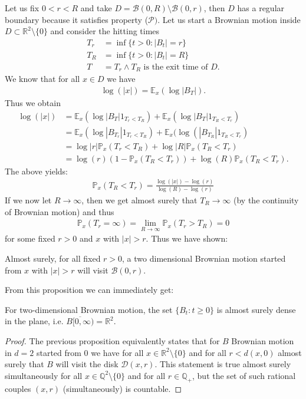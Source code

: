 \documentclass[../mainfile.tex]{subfiles}
\begin{document}
\begin{exmp} Let us fix $0<r<R$ and take $D= \mathcal{B}(0,R) \setminus \mathcal{B}(0,r)$, then $D$ has a regular boundary because it satisfies property ($\mathcal{P})$. Let us start a Brownian motion inside $D \subset \mathbb{R}^2 \setminus \{0\}$ and consider the hitting times
\begin{align*}
T_r&= \inf \{ t>0 : |B_t| =r \} \\
T_R& = \inf \{ t >0 : |B_t|=R\} \\
T&= T_r \wedge T_R \text{ is the exit time of }D. 
\end{align*}
We know that for all $x \in D$ we have 
\begin{align*}
\log(|x|)= \mathbb{E}_x( \log |B_T|).
\end{align*}
Thus we obtain 
\begin{align*}
\log(|x|) &= \mathbb{E}_x( \log |B_T| 1_{T_r < T_R}) + \mathbb{E}_x( \log |B_T| 1_{T_R < T_r})  \\
&= \mathbb{E}_x( \log|B_{T_r}| 1_{T_r < T_R}) + \mathbb{E}_x( \log( |B_{T_R}| 1_{T_R < T_r}) \\
&= \log|r| \mathbb{P}_x( T_r < T_R) + \log|R| \mathbb{P}_x(T_R < T_r)  \\
& = \log(r) (1- \mathbb{P}_x(T_R < T_r)) + \log(R) \mathbb{P}_x ( T_R < T_r).
\end{align*}
The above yields:
\begin{align*}
\mathbb{P}_x( T_R < T_r) = \frac{\log(|x|)- \log(r)}{\log(R)- \log(r)} \tag{*}
\end{align*}
If we now let $R \to \infty$, then we get almost surely that $T_R \to \infty$ (by the continuity of Brownian motion) and thus 
\begin{align*}
\mathbb{P}_x(T_r = \infty) = \lim_{R \to \infty} \mathbb{P}_x( T_r > T_R)=0
\end{align*}
for some fixed $r>0$ and $x$ with $|x|>r$. Thus we have shown:
\begin{prop} Almost surely, for all fixed $r>0$, a two dimensional Brownian motion started from $x$ with $|x|>r$ will visit $\mathcal{B}(0,r)$. 
\end{prop}
From this proposition we can immediately get:
\begin{thm} For two-dimensional Brownian motion, the set $\{B_t: t \geq 0\}$ is almost surely dense in the plane, i.e. $\overline{B[0, \infty)}= \mathbb{R}^2$.
\end{thm}
\begin{proof}
The previous proposition equivalently states that for $B$ Brownian motion in $d=2$ started from $0$ we have for all $x \in \mathbb{R}^2 \setminus \{0\}$ and for all $r<d(x,0)$ almost surely that $B$ will visit the disk $\mathcal{D}(x,r)$. This statement is true almost surely simultaneously  for all $x \in \mathbb{Q}^2 \setminus \{0\}$ and for all $r \in \mathbb{Q}_+$, but the set of such rational couples $(x,r)$ (simultaneously) is countable. 

\end{proof}
\end{exmp}
\end{document}
